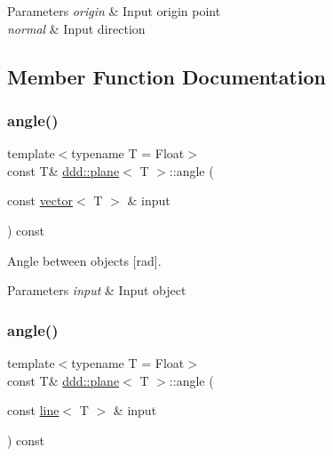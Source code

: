 \begin{DoxyParams}{Parameters}
{\em origin} & Input origin point \\
\hline
{\em normal} & Input direction \\
\hline
\end{DoxyParams}


\subsection{Member Function Documentation}
\mbox{\label{classddd_1_1plane_a07f91cce7fe6dc942c62311e4dfa10d9}} 
\subsubsection{\texorpdfstring{angle()}{angle()}\hspace{0.1cm}{\footnotesize\ttfamily [1/5]}}
{\footnotesize\ttfamily template$<$typename T = Float$>$ \\
const T\& \hyperlink{classddd_1_1plane}{ddd\+::plane}$<$ T $>$\+::angle (\begin{DoxyParamCaption}\item[{const \hyperlink{classddd_1_1vector}{vector}$<$ T $>$ \&}]{input }\end{DoxyParamCaption}) const\hspace{0.3cm}{\ttfamily [inline]}}



Angle between objects \mbox{[}rad\mbox{]}. 


\begin{DoxyParams}{Parameters}
{\em input} & Input object \\
\hline
\end{DoxyParams}
\mbox{\label{classddd_1_1plane_a5107cac34cbae7ff286f0b0e9a90c940}} 
\subsubsection{\texorpdfstring{angle()}{angle()}\hspace{0.1cm}{\footnotesize\ttfamily [2/5]}}
{\footnotesize\ttfamily template$<$typename T = Float$>$ \\
const T\& \hyperlink{classddd_1_1plane}{ddd\+::plane}$<$ T $>$\+::angle (\begin{DoxyParamCaption}\item[{const \hyperlink{classddd_1_1line}{line}$<$ T $>$ \&}]{input }\end{DoxyParamCaption}) const\hspace{0.3cm}{\ttfamily [inline]}}



